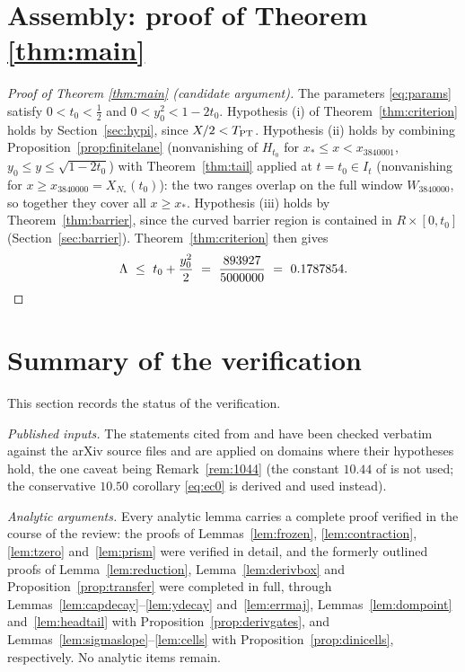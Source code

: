 \documentclass[11pt]{article}
\theoremstyle{definition}
\newcommand{\LB}{\Lambda}
\begin{document}
\section{Assembly: proof of Theorem \ref{thm:main}}

\begin{proof}[Proof of Theorem \ref{thm:main} (candidate argument)]
The parameters \eqref{eq:params} satisfy $0<t_0<\frac12$ and
$0<y_0^2<1-2t_0$. Hypothesis (i) of Theorem~\ref{thm:criterion}
holds by Section~\ref{sec:hypi}, since $X/2<T_{\rm PT}$. Hypothesis
(ii) holds by combining Proposition~\ref{prop:finitelane}
(nonvanishing of $H_{t_0}$ for $x_*\le x<x_{3840001}$,
$y_0\le y\le\sqrt{1-2t_0}$) with Theorem~\ref{thm:tail} applied at
$t=t_0\in I_t$ (nonvanishing for $x\ge x_{3840000}=X_{N_*}(t_0)$):
the two ranges overlap on the full window $W_{3840000}$, so together
they cover all $x\ge x_*$. Hypothesis (iii) holds by
Theorem~\ref{thm:barrier}, since the curved barrier region is
contained in $R\times[0,t_0]$
(Section~\ref{sec:barrier}). Theorem~\ref{thm:criterion} then gives
\[
\LB\ \le\ t_0+\frac{y_0^2}{2}\ =\ \frac{893927}{5000000}
\ =\ 0.1787854 . \qedhere
\]
\end{proof}

\section{Summary of the verification}
\label{sec:gaps}

This section records the status of the verification.

\emph{Published inputs.} The statements cited from \cite{Polymath}
and \cite{PlattTrudgian} have been checked verbatim against the
arXiv source files and are applied on domains where their
hypotheses hold, the one caveat being Remark~\ref{rem:1044} (the
constant $10.44$ of \cite[eq.~(24)]{Polymath} is not used; the
conservative $10.50$ corollary \eqref{eq:ec0} is derived and used
instead).

\emph{Analytic arguments.} Every analytic lemma carries a complete
proof verified in the course of the review: the proofs of
Lemmas~\ref{lem:frozen}, \ref{lem:contraction}, \ref{lem:tzero}
and~\ref{lem:prism} were verified in detail, and the formerly
outlined proofs of Lemma~\ref{lem:reduction},
Lemma~\ref{lem:derivbox} and Proposition~\ref{prop:transfer} were
completed in full, through
Lemmas~\ref{lem:capdecay}--\ref{lem:ydecay} and~\ref{lem:errmaj},
Lemmas~\ref{lem:dompoint} and~\ref{lem:headtail} with
Proposition~\ref{prop:derivgates}, and
Lemmas~\ref{lem:sigmaslope}--\ref{lem:cells} with
Proposition~\ref{prop:dinicells}, respectively. No analytic items
remain.
\end{document}
